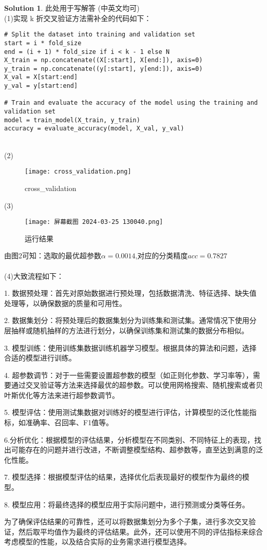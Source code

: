 \documentclass[a4paper,UTF8]{article}
\numberwithin{equation}{section}
\theoremstyle{definition}
\newtheorem*{solution}{Solution}
\begin{document}
\begin{solution}
    此处用于写解答 (中英文均可)
    ~\\
    (1)实现 k 折交叉验证方法需补全的代码如下：
\begin{verbatim}
# Split the dataset into training and validation set
start = i * fold_size
end = (i + 1) * fold_size if i < k - 1 else N
X_train = np.concatenate((X[:start], X[end:]), axis=0)
y_train = np.concatenate((y[:start], y[end:]), axis=0)
X_val = X[start:end]
y_val = y[start:end]

# Train and evaluate the accuracy of the model using the training and validation set
model = train_model(X_train, y_train)
accuracy = evaluate_accuracy(model, X_val, y_val)
\end{verbatim}\\
(2)\begin{figure}[H]
	\centering
	\texttt{[image: cross\_validation.png]}
	\caption{cross\_validation}
	\label{fig:cv}
\end{figure}

(3)
\begin{figure}[H]
	\centering
	\texttt{[image: 屏幕截图 2024-03-25 130040.png]}
	\caption{运行结果}
	\label{fig:cv}
\end{figure}
由图2可知：选取的最优超参数$\alpha=0.0014$,对应的分类精度$acc=0.7827$\\
\\
    (4)大致流程如下：

1. 数据预处理：首先对原始数据进行预处理，包括数据清洗、特征选择、缺失值处理等，以确保数据的质量和可用性。

2. 数据集划分：将预处理后的数据集划分为训练集和测试集。通常情况下使用分层抽样或随机抽样的方法进行划分，以确保训练集和测试集的数据分布相似。

3. 模型训练：使用训练集数据训练机器学习模型。根据具体的算法和问题，选择合适的模型进行训练。

4. 超参数调节：对于一些需要设置超参数的模型（如正则化参数、学习率等），需要通过交叉验证等方法来选择最优的超参数。可以使用网格搜索、随机搜索或者贝叶斯优化等方法来进行超参数调节。

5. 模型评估：使用测试集数据对训练好的模型进行评估，计算模型的泛化性能指标，如准确率、召回率、F1值等。

6.分析优化：根据模型的评估结果，分析模型在不同类别、不同特征上的表现，找出可能存在的问题并进行改进，不断调整模型结构、超参数等，直至达到满意的泛化性能。

7. 模型选择：根据模型评估的结果，选择优化后表现最好的模型作为最终的模型。

8. 模型应用：将最终选择的模型应用于实际问题中，进行预测或分类等任务。

为了确保评估结果的可靠性，还可以将数据集划分为多个子集，进行多次交叉验证，然后取平均值作为最终的评估结果。此外，还可以使用不同的评估指标来综合考虑模型的性能，以及结合实际的业务需求进行模型选择。\\
\end{solution}
\end{document}
